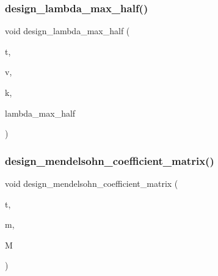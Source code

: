 \mbox{\label{_l_i_b_2_d_i_s_c_r_e_t_a_2design_8_c_accb093d81f75d5cd3d46f566bba28d6a}} 
\subsubsection{\texorpdfstring{design\+\_\+lambda\+\_\+max\+\_\+half()}{design\_lambda\_max\_half()}}
{\footnotesize\ttfamily void design\+\_\+lambda\+\_\+max\+\_\+half (\begin{DoxyParamCaption}\item[{\mbox{\hyperlink{galois_8h_a09fddde158a3a20bd2dcadb609de11dc}{I\+NT}}}]{t,  }\item[{\mbox{\hyperlink{galois_8h_a09fddde158a3a20bd2dcadb609de11dc}{I\+NT}}}]{v,  }\item[{\mbox{\hyperlink{galois_8h_a09fddde158a3a20bd2dcadb609de11dc}{I\+NT}}}]{k,  }\item[{\mbox{\hyperlink{classdiscreta__base}{discreta\+\_\+base}} \&}]{lambda\+\_\+max\+\_\+half }\end{DoxyParamCaption})}

\mbox{\label{_l_i_b_2_d_i_s_c_r_e_t_a_2design_8_c_a31e815659d2f41355da6fcc45669e165}} 
\subsubsection{\texorpdfstring{design\+\_\+mendelsohn\+\_\+coefficient\+\_\+matrix()}{design\_mendelsohn\_coefficient\_matrix()}}
{\footnotesize\ttfamily void design\+\_\+mendelsohn\+\_\+coefficient\+\_\+matrix (\begin{DoxyParamCaption}\item[{\mbox{\hyperlink{galois_8h_a09fddde158a3a20bd2dcadb609de11dc}{I\+NT}}}]{t,  }\item[{\mbox{\hyperlink{galois_8h_a09fddde158a3a20bd2dcadb609de11dc}{I\+NT}}}]{m,  }\item[{\mbox{\hyperlink{classmatrix}{matrix}} \&}]{M }\end{DoxyParamCaption})}

